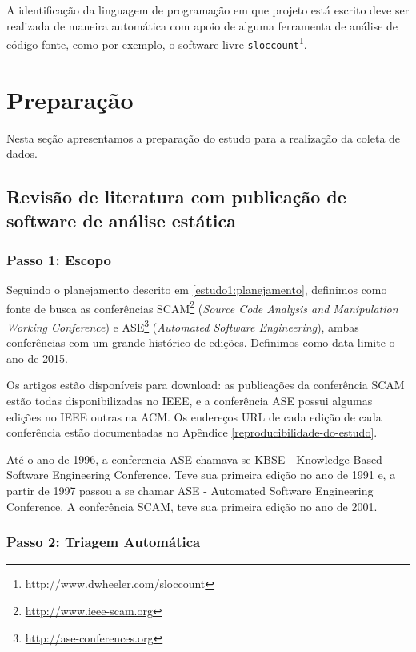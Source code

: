 A identificação da linguagem de programação em que projeto está escrito deve ser
realizada de maneira automática com apoio de alguma ferramenta de análise de
código fonte, como por exemplo, o software livre
\texttt{sloccount}\footnote{http://www.dwheeler.com/sloccount}.


\section{Preparação} \label{estudo1:preparacao} %

Nesta seção apresentamos a preparação do estudo para a realização da coleta de
dados.

\subsection{Revisão de literatura com publicação de software de análise estática}

\subsubsection{Passo 1: Escopo}

Seguindo o planejamento descrito em \ref{estudo1:planejamento}, definimos como
fonte de busca as conferências SCAM\footnote{\url{http://www.ieee-scam.org}}
({\it Source Code Analysis and Manipulation Working Conference}) e
ASE\footnote{\url{http://ase-conferences.org}} ({\it Automated Software
Engineering}), ambas conferências com um grande histórico de edições. Definimos
como data limite o ano de 2015.

Os artigos estão disponíveis para download: 
as publicações da conferência SCAM estão todas disponibilizadas no IEEE, e
a conferência ASE possui algumas edições no IEEE outras na ACM. Os endereços URL
de cada edição de cada conferência estão documentadas no Apêndice
\ref{reproducibilidade-do-estudo}.

Até o ano de 1996, a conferencia ASE chamava-se KBSE - Knowledge-Based Software
Engineering Conference. Teve sua primeira edição no ano de 1991 e, a partir de 1997 
passou a se chamar  ASE - Automated Software Engineering Conference.
A conferência SCAM, teve sua primeira edição no ano de 2001.

\subsubsection{Passo 2: Triagem Automática}

